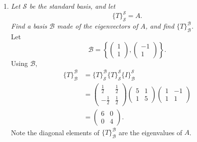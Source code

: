 \documentclass[12pt]{article}
\newcommand{\based}[3]{{\{#1\}}_{#2}^{#3}}
\begin{document}
\begin{enumerate}[label=(\alph*)]
	\item \textit{Let $\mathcal{S}$ be the standard basis, and let}
	\begin{equation*}
		\based{T}{\mathcal{S}}{\mathcal{S}} = A.
	\end{equation*}
	\textit{Find a basis $\mathcal{B}$ made of the eigenvectors of $A$, and
	find $\based{T}{\mathcal{B}}{\mathcal{B}}$.} \\[\baselineskip]
	Let
	\begin{equation*}
		\mathcal{B}
		=
		\left\{
			\begin{pmatrix} 1 \\ 1 \end{pmatrix},
			\begin{pmatrix} -1 \\ 1 \end{pmatrix}
		\right\}
		.
	\end{equation*}
	Using $\mathcal{B}$,
	\begin{align*}
		\based{T}{\mathcal{B}}{\mathcal{B}}
		&=
		\based{T}{\mathcal{S}}{\mathcal{B}}
		\based{T}{\mathcal{S}}{\mathcal{S}}
		\based{I}{\mathcal{B}}{\mathcal{S}}
		\\
		&=
		\begin{pmatrix}
			\frac{1}{2} & \frac{1}{2} \\
			-\frac{1}{2} & \frac{1}{2}
		\end{pmatrix}
		\begin{pmatrix} 5 & 1 \\ 1 & 5 \end{pmatrix}
		\begin{pmatrix} 1 & -1 \\ 1 & 1 \end{pmatrix}
		\\
		&=
		\boxed{
			\begin{pmatrix} 6 & 0 \\ 0 & 4 \end{pmatrix}
		}
		.
	\end{align*}
	Note the diagonal elements of $\based{T}{\mathcal{B}}{\mathcal{B}}$ are
	the eigenvalues of $A$.
\end{enumerate}
\newpage
\end{document}
